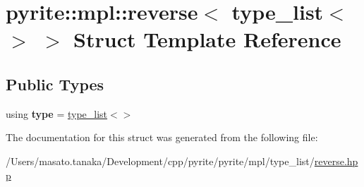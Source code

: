 \hypertarget{structpyrite_1_1mpl_1_1reverse_3_01type__list_3_4_01_4}{}\section{pyrite\+:\+:mpl\+:\+:reverse$<$ type\+\_\+list$<$$>$ $>$ Struct Template Reference}
\label{structpyrite_1_1mpl_1_1reverse_3_01type__list_3_4_01_4}
\subsection*{Public Types}
\begin{DoxyCompactItemize}
\item 
\mbox{\label{structpyrite_1_1mpl_1_1reverse_3_01type__list_3_4_01_4_a32ca95170698543f6fb0b12642397f80}} 
using {\bfseries type} = \mbox{\hyperlink{structpyrite_1_1core_1_1mpl_1_1type__list}{type\+\_\+list}}$<$$>$
\end{DoxyCompactItemize}


The documentation for this struct was generated from the following file\+:\begin{DoxyCompactItemize}
\item 
/\+Users/masato.\+tanaka/\+Development/cpp/pyrite/pyrite/mpl/type\+\_\+list/\mbox{\hyperlink{reverse_8hpp}{reverse.\+hpp}}\end{DoxyCompactItemize}
